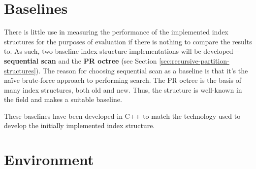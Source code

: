 \begin{table}
	\centering
	\caption{Operation Lists Used for Main Evaluation}
	\label{tab:operation-lists}
\end{table}

\section{Baselines}
\label{sec:baselines}

There is little use in measuring the performance of the implemented index structures for the purposes of evaluation if there is nothing to compare the results to. As such, two baseline index structure implementations will be developed -- \textbf{sequential scan} and the \textbf{PR octree} (see Section \ref{sec:recursive-partition-structures}). The reason for choosing sequential scan as a baseline is that it's the na\"{i}ve brute-force approach to performing search. The PR octree is the basis of many index structures, both old and new. Thus, the structure is well-known in the field and makes a suitable baseline.

These baselines have been developed in C++ to match the technology used to develop the initially implemented index structure.

\section{Environment}

